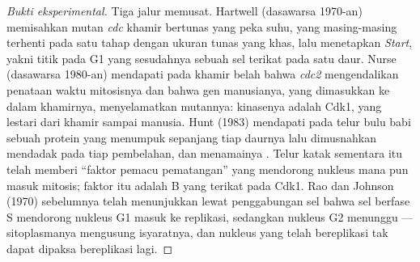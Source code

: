 \begin{proof}[Bukti eksperimental]
Tiga jalur memusat. Hartwell (dasawarsa 1970-an) memisahkan mutan
\emph{cdc} khamir bertunas yang peka suhu, yang masing-masing terhenti pada
satu tahap dengan ukuran tunas yang khas, lalu menetapkan \emph{Start}, yakni
titik pada G1 yang sesudahnya sebuah sel terikat pada satu daur. Nurse
(dasawarsa 1980-an) mendapati pada khamir belah bahwa \emph{cdc2} mengendalikan
penataan waktu mitosisnya dan bahwa gen manusianya, yang dimasukkan ke dalam
khamirnya, menyelamatkan mutannya: kinasenya adalah Cdk1, yang lestari dari
khamir sampai manusia. Hunt (1983) mendapati pada telur bulu babi sebuah
protein yang menumpuk sepanjang tiap daurnya lalu dimusnahkan
mendadak pada tiap pembelahan, dan menamainya . Telur katak
sementara itu telah memberi ``faktor pemacu pematangan'' yang mendorong
nukleus mana pun masuk mitosis; faktor itu adalah  B yang terikat pada
Cdk1. Rao dan Johnson (1970) sebelumnya telah menunjukkan lewat penggabungan
sel bahwa sel berfase S mendorong nukleus G1 masuk ke replikasi, sedangkan
nukleus G2 menunggu --- sitoplasmanya mengusung isyaratnya, dan nukleus yang
telah bereplikasi tak dapat dipaksa bereplikasi lagi.
\end{proof}

